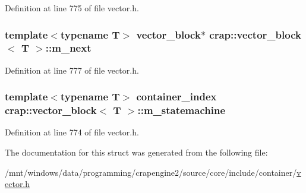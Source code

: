 Definition at line 775 of file vector.\+h.

\hypertarget{structcrap_1_1vector__block_a7eb66a312dc9bb9c5e7b57ab640d05e8}{
\subsubsection[{m\+\_\+next}]{\setlength{\rightskip}{0pt plus 5cm}template$<$typename T$>$ {\bf vector\+\_\+block}$\ast$ {\bf crap\+::vector\+\_\+block}$<$ T $>$\+::m\+\_\+next}}\label{structcrap_1_1vector__block_a7eb66a312dc9bb9c5e7b57ab640d05e8}


Definition at line 777 of file vector.\+h.

\hypertarget{structcrap_1_1vector__block_a9a677e8f67671c6fd2079eaa5d21bfb5}{
\subsubsection[{m\+\_\+statemachine}]{\setlength{\rightskip}{0pt plus 5cm}template$<$typename T$>$ container\+\_\+index {\bf crap\+::vector\+\_\+block}$<$ T $>$\+::m\+\_\+statemachine}}\label{structcrap_1_1vector__block_a9a677e8f67671c6fd2079eaa5d21bfb5}


Definition at line 774 of file vector.\+h.



The documentation for this struct was generated from the following file\+:\begin{DoxyCompactItemize}
\item 
/mnt/windows/data/programming/crapengine2/source/core/include/container/\hyperlink{vector_8h}{vector.\+h}\end{DoxyCompactItemize}
